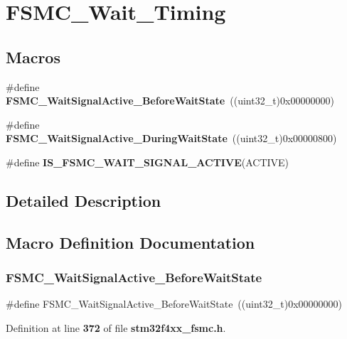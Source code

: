 \section{F\+S\+M\+C\+\_\+\+Wait\+\_\+\+Timing}
\label{group__FSMC__Wait__Timing}
\subsection*{Macros}
\begin{DoxyCompactItemize}
\item 
\#define \textbf{ F\+S\+M\+C\+\_\+\+Wait\+Signal\+Active\+\_\+\+Before\+Wait\+State}~((uint32\+\_\+t)0x00000000)
\item 
\#define \textbf{ F\+S\+M\+C\+\_\+\+Wait\+Signal\+Active\+\_\+\+During\+Wait\+State}~((uint32\+\_\+t)0x00000800)
\item 
\#define \textbf{ I\+S\+\_\+\+F\+S\+M\+C\+\_\+\+W\+A\+I\+T\+\_\+\+S\+I\+G\+N\+A\+L\+\_\+\+A\+C\+T\+I\+VE}(A\+C\+T\+I\+VE)
\end{DoxyCompactItemize}


\subsection{Detailed Description}


\subsection{Macro Definition Documentation}
\mbox{\label{group__FSMC__Wait__Timing_ga62c6855a7cc65b20024085f09cdc65e8}} 
\subsubsection{F\+S\+M\+C\+\_\+\+Wait\+Signal\+Active\+\_\+\+Before\+Wait\+State}
{\footnotesize\ttfamily \#define F\+S\+M\+C\+\_\+\+Wait\+Signal\+Active\+\_\+\+Before\+Wait\+State~((uint32\+\_\+t)0x00000000)}



Definition at line \textbf{ 372} of file \textbf{ stm32f4xx\+\_\+fsmc.\+h}.

